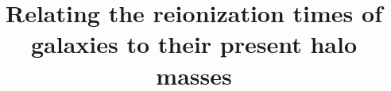 \documentclass[twocolumn]{aastex61}
\begin{document}
\title{Relating the reionization times of galaxies to their present halo masses}



\end{document}
